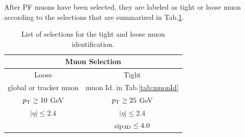 After PF muons have been selected, they are labeled as tight or loose muon according to the selections that are summarized in Tab.\ref{tab:muonSel}.
\renewcommand{\arraystretch}{1.5}
\begin{table}[ht]
\begin{center}
\begin{tabular}{|c|c|}\hline
\multicolumn{2}{|c|}{Muon Selection} \\\hline\hline
 Loose & Tight \\\hline
global or tracker muon & muon Id. in Tab.\ref{tab:muonId}\\\hline
$p_{\rm T}\geq10$ GeV & $p_{\rm T}\geq25$ GeV \\\hline
$|\eta|\leq2.4$ & $|\eta|\leq2.4$ \\\hline
& sip$_{\rm 3D}\leq4.0$\\
\hline
\end{tabular}
\end{center}
\caption{List of selections for the tight and loose muon identification.}\label{tab:muonSel}
\end{table}
\renewcommand{\arraystretch}{1}

\renewcommand{\arraystretch}{1.5}
\begin{table}[ht]
\begin{center}
\end{center}
\caption{List of selections for the muon identification.}\label{tab:muonId}
\end{table}
\renewcommand{\arraystretch}{1}
